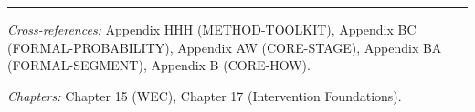 \nocite{bcm_master}



\vspace{1em}
\hrule
\vspace{0.5em}

\noindent\textit{Cross-references:}
Appendix HHH (METHOD-TOOLKIT),
Appendix BC (FORMAL-PROBABILITY),
Appendix AW (CORE-STAGE),
Appendix BA (FORMAL-SEGMENT),
Appendix B (CORE-HOW).

\noindent\textit{Chapters:} Chapter 15 (WEC), Chapter 17 (Intervention Foundations).


